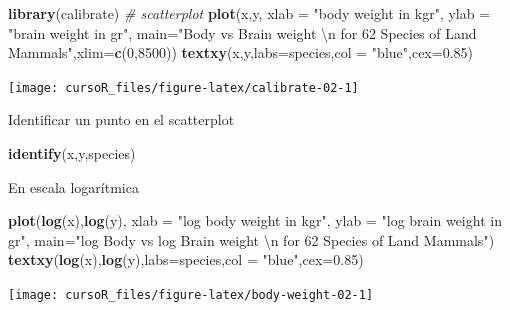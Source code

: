 \documentclass[]{book}
\newenvironment{Shaded}{\begin{snugshade}}{\end{snugshade}}
\newcommand{\KeywordTok}[1]{\textcolor[rgb]{0.13,0.29,0.53}{\textbf{#1}}}
\newcommand{\DataTypeTok}[1]{\textcolor[rgb]{0.13,0.29,0.53}{#1}}
\newcommand{\DecValTok}[1]{\textcolor[rgb]{0.00,0.00,0.81}{#1}}
\newcommand{\FloatTok}[1]{\textcolor[rgb]{0.00,0.00,0.81}{#1}}
\newcommand{\CharTok}[1]{\textcolor[rgb]{0.31,0.60,0.02}{#1}}
\newcommand{\StringTok}[1]{\textcolor[rgb]{0.31,0.60,0.02}{#1}}
\newcommand{\CommentTok}[1]{\textcolor[rgb]{0.56,0.35,0.01}{\textit{#1}}}
\newcommand{\NormalTok}[1]{#1}
\begin{document}
\begin{Shaded}
\begin{Highlighting}[]
\KeywordTok{library}\NormalTok{(calibrate)}
\CommentTok{# scatterplot}
\KeywordTok{plot}\NormalTok{(x,y, }\DataTypeTok{xlab =} \StringTok{"body weight in kgr"}\NormalTok{, }\DataTypeTok{ylab =} \StringTok{"brain weight in gr"}\NormalTok{, }
     \DataTypeTok{main=}\StringTok{"Body vs Brain weight }\CharTok{\textbackslash{}n}\StringTok{ for 62 Species of Land Mammals"}\NormalTok{,}\DataTypeTok{xlim=}\KeywordTok{c}\NormalTok{(}\DecValTok{0}\NormalTok{,}\DecValTok{8500}\NormalTok{))}
\KeywordTok{textxy}\NormalTok{(x,y,}\DataTypeTok{labs=}\NormalTok{species,}\DataTypeTok{col =} \StringTok{"blue"}\NormalTok{,}\DataTypeTok{cex=}\FloatTok{0.85}\NormalTok{) }
\end{Highlighting}
\end{Shaded}

\begin{center}\texttt{[image: cursoR\_files/figure-latex/calibrate-02-1]} \end{center}

Identificar un punto en el scatterplot

\begin{Shaded}
\begin{Highlighting}[]
\KeywordTok{identify}\NormalTok{(x,y,species)}
\end{Highlighting}
\end{Shaded}

En escala logarítmica

\begin{Shaded}
\begin{Highlighting}[]
\KeywordTok{plot}\NormalTok{(}\KeywordTok{log}\NormalTok{(x),}\KeywordTok{log}\NormalTok{(y), }\DataTypeTok{xlab =} \StringTok{"log body weight in kgr"}\NormalTok{, }\DataTypeTok{ylab =} \StringTok{"log brain weight in gr"}\NormalTok{, }
     \DataTypeTok{main=}\StringTok{"log Body vs log Brain weight }\CharTok{\textbackslash{}n}\StringTok{ for 62 Species of Land Mammals"}\NormalTok{)}
\KeywordTok{textxy}\NormalTok{(}\KeywordTok{log}\NormalTok{(x),}\KeywordTok{log}\NormalTok{(y),}\DataTypeTok{labs=}\NormalTok{species,}\DataTypeTok{col =} \StringTok{"blue"}\NormalTok{,}\DataTypeTok{cex=}\FloatTok{0.85}\NormalTok{) }
\end{Highlighting}
\end{Shaded}

\begin{center}\texttt{[image: cursoR\_files/figure-latex/body-weight-02-1]} \end{center}
\end{document}
